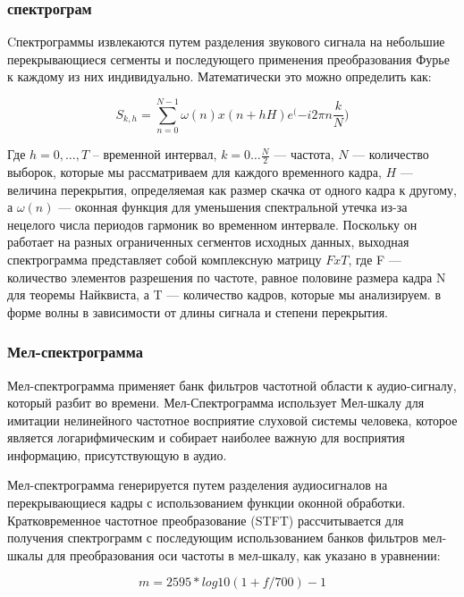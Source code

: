 \subsubsection{спектрограм}

Cпектрограммы извлекаются путем разделения звукового сигнала на небольшие перекрывающиеся сегменты и последующего применения преобразования Фурье к каждому из них индивидуально.
Математически это можно определить как:

\begin{equation}
    S_{k,h} = \sum_{n=0}^{N - 1} \omega (n) x(n + hH)e^({-i2\pi n \frac{k}{N})}
\end{equation}

Где \(h = 0, \ldots , T\) – временной интервал, \(k = 0 \ldots \frac{N}{2}\) — частота, \(N\) — количество выборок, которые мы рассматриваем для каждого временного кадра, \(H\) — величина перекрытия, определяемая как размер скачка от одного кадра к другому, а \(\omega(n)\) — оконная функция для уменьшения спектральной утечка из-за нецелого числа периодов гармоник во временном интервале. Поскольку он работает на разных ограниченных сегментов исходных данных, выходная спектрограмма представляет собой комплексную матрицу \(FxT\), где F — количество элементов разрешения по частоте, равное половине размера кадра N для теоремы Найквиста, а T — количество кадров, которые мы анализируем. в форме волны в зависимости от длины сигнала и степени перекрытия.

\subsubsection{Мел-спектрограмма}

Мел-спектрограмма применяет банк фильтров частотной области к аудио-сигналу, который разбит во времени. Мел-Спектрограмма  использует Мел-шкалу для имитации нелинейного частотное восприятие слуховой системы человека, которое является логарифмическим и собирает наиболее важную для восприятия информацию, присутствующую в аудио.

Мел-спектрограмма генерируется путем разделения аудиосигналов на перекрывающиеся кадры с использованием функции оконной обработки. Кратковременное частотное преобразование (STFT) рассчитывается для получения спектрограмм с последующим использованием банков фильтров мел-шкалы для преобразования оси частоты в мел-шкалу, как указано в уравнении: 

\begin{equation}
    m = 2595 * log 10(1 + f / 700) - 1
\end{equation}

